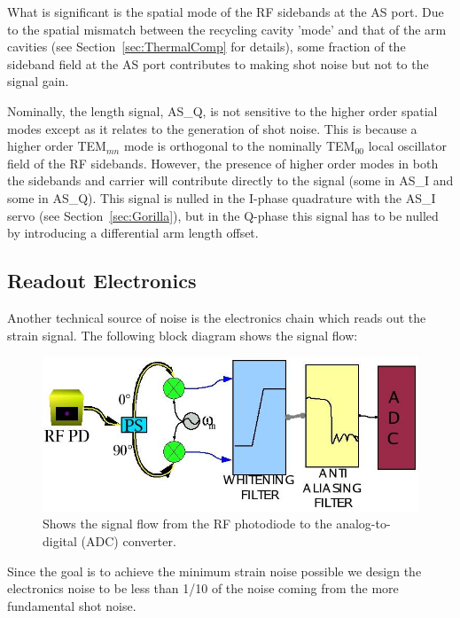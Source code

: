 What is significant is the spatial mode of the RF sidebands at the
AS port. Due to the spatial mismatch between the
recycling cavity 'mode' and that of the arm cavities
(see Section~\ref{sec:ThermalComp} for details), some fraction
of the sideband field at the AS port contributes to making
shot noise but not to the signal gain.

Nominally, the length signal, AS\_Q, is not sensitive to the higher
order spatial modes except as it relates to the generation of shot noise.
This is because a higher order TEM$_{mn}$ mode is orthogonal to the
nominally TEM$_{00}$ local oscillator field of the RF sidebands.
However, the presence of higher order modes in both the sidebands and
carrier will contribute directly to the signal (some in AS\_I
and some in AS\_Q). This signal is nulled in the I-phase quadrature
with the AS\_I servo (see Section~\ref{sec:Gorilla}), but in the
Q-phase this signal has to be nulled by introducing a differential
arm length offset.



\subsection{Readout Electronics}

Another technical source of noise is the electronics chain which reads
out the strain signal. The following block diagram shows the signal flow:

\begin{figure}[!h]
\centerline{
\includegraphics[angle=0,width=6.5in]{Figures/Chap4/SensingChain.jpg}}
\caption[Sensing Electronics]{Shows the signal flow from the RF photodiode to
         the analog-to-digital (ADC) converter.}
\end{figure}

Since the goal is to achieve the minimum strain noise possible we design
the electronics noise to be less than 1/10 of the noise coming from the more
fundamental shot noise.

